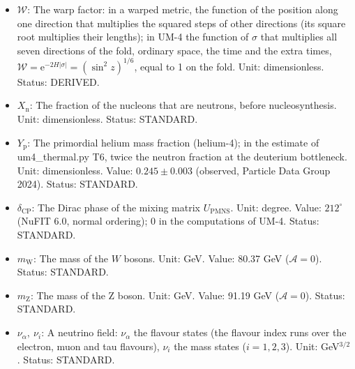 \documentclass[
  10pt,
]{article}
\begin{document}
\begin{itemize}
  are compact. Unit: length. Status: ASSUMED.
\item
  \(\mathcal{W}\): The warp factor: in a warped metric, the function of
  the position along one direction that multiplies the squared steps of
  other directions (its square root multiplies their lengths); in UM-4
  the function of \(\sigma\) that multiplies all seven directions of the
  fold, ordinary space, the time and the extra times,
  \(\mathcal{W} = \mathrm{e}^{-2H\lvert\sigma\rvert} = (\sin^2z)^{1/6}\),
  equal to 1 on the fold. Unit: dimensionless. Status: DERIVED.
\item
  \(X_{\mathrm{n}}\): The fraction of the nucleons that are neutrons,
  before nucleosynthesis. Unit: dimensionless. Status: STANDARD.
\item
  \(Y_{\mathrm{p}}\): The primordial helium mass fraction (helium-4); in
  the estimate of um4\_thermal.py T6, twice the neutron fraction at the
  deuterium bottleneck. Unit: dimensionless. Value: \(0.245 \pm 0.003\)
  (observed, Particle Data Group 2024). Status: STANDARD.
\item
  \(\delta_{\mathrm{CP}}\): The Dirac phase of the mixing matrix
  \(U_{\mathrm{PMNS}}\). Unit: degree. Value: \(212^\circ\) (NuFIT 6.0,
  normal ordering); 0 in the computations of UM-4. Status: STANDARD.
\item
  \(m_{\mathrm{W}}\): The mass of the \(W\) bosons. Unit: GeV. Value:
  80.37 GeV (\(\mathcal{A} = 0\)). Status: STANDARD.
\item
  \(m_{\mathrm{Z}}\): The mass of the Z boson. Unit: GeV. Value: 91.19
  GeV (\(\mathcal{A} = 0\)). Status: STANDARD.
\item
  \(\nu_\alpha,\ \nu_i\): A neutrino field: \(\nu_\alpha\) the flavour
  states (the flavour index runs over the electron, muon and tau
  flavours), \(\nu_i\) the mass states (\(i = 1, 2, 3\)). Unit:
  GeV\(^{3/2}\). Status: STANDARD.
\end{itemize}
\end{document}
